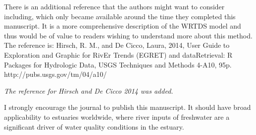 \documentclass[letterpaper,12pt,oneside]{article}\usepackage[]{graphicx}\usepackage[]{color}
\begin{document}
There is an additional reference that the authors might want to consider including, which only became available around the time they completed this manuscript.  It is a more comprehensive description of the WRTDS model and thus would be of value to readers wishing to understand more about this method.  The reference is:  Hirsch, R. M., and De Cicco, Laura, 2014, User Guide to Exploration and Graphic for RivEr Trends (EGRET) and dataRetrieval: R Packages for Hydrologic Data, USGS Techniques and Methods 4-A10, 95p.  http://pubs.usgs.gov/tm/04/a10/

{\it The reference for Hirsch and De Cicco 2014 was added.}

I strongly encourage the journal to publish this manuscript.  It should have broad applicability to estuaries worldwide, where river inputs of freshwater are a significant driver of water quality conditions in the estuary.
\end{document}
